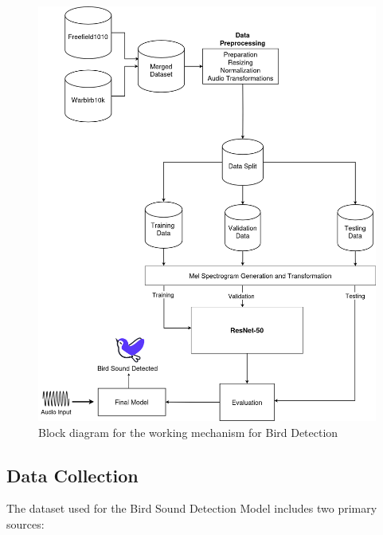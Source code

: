       \begin{figure}[h!]
            \centering
            \includegraphics[scale=0.33]{images/MajorProject-Detection.png}
            \caption{Block diagram for the working mechanism for Bird Detection}
            \label{fig:working_bird_det}
      \end{figure}

      \subsection{Data Collection}
      The dataset used for the Bird Sound Detection Model includes two primary sources:

